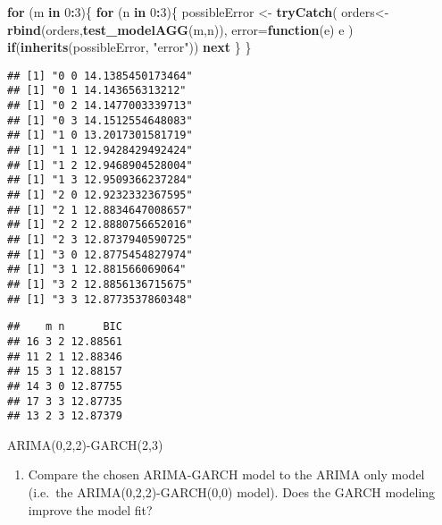 \documentclass[
]{article}
\newenvironment{Shaded}{\begin{snugshade}}{\end{snugshade}}
\newcommand{\ControlFlowTok}[1]{\textcolor[rgb]{0.13,0.29,0.53}{\textbf{#1}}}
\newcommand{\DataTypeTok}[1]{\textcolor[rgb]{0.13,0.29,0.53}{#1}}
\newcommand{\DecValTok}[1]{\textcolor[rgb]{0.00,0.00,0.81}{#1}}
\newcommand{\KeywordTok}[1]{\textcolor[rgb]{0.13,0.29,0.53}{\textbf{#1}}}
\newcommand{\NormalTok}[1]{#1}
\newcommand{\OperatorTok}[1]{\textcolor[rgb]{0.81,0.36,0.00}{\textbf{#1}}}
\newcommand{\StringTok}[1]{\textcolor[rgb]{0.31,0.60,0.02}{#1}}
\providecommand{\tightlist}{%
  \setlength{\itemsep}{0pt}\setlength{\parskip}{0pt}}
\begin{document}
\begin{Shaded}
\begin{Highlighting}[]
\ControlFlowTok{for}\NormalTok{ (m }\ControlFlowTok{in} \DecValTok{0}\OperatorTok{:}\DecValTok{3}\NormalTok{)\{}
     \ControlFlowTok{for}\NormalTok{ (n }\ControlFlowTok{in} \DecValTok{0}\OperatorTok{:}\DecValTok{3}\NormalTok{)\{}
\NormalTok{          possibleError \textless{}{-}}\StringTok{ }\KeywordTok{tryCatch}\NormalTok{(}
\NormalTok{            orders\textless{}{-}}\KeywordTok{rbind}\NormalTok{(orders,}\KeywordTok{test\_modelAGG}\NormalTok{(m,n)),}
            \DataTypeTok{error=}\ControlFlowTok{function}\NormalTok{(e) e}
\NormalTok{          )}
          \ControlFlowTok{if}\NormalTok{(}\KeywordTok{inherits}\NormalTok{(possibleError, }\StringTok{"error"}\NormalTok{)) }\ControlFlowTok{next}
\NormalTok{          \}}
\NormalTok{\}}
\end{Highlighting}
\end{Shaded}

\begin{verbatim}
## [1] "0 0 14.1385450173464"
## [1] "0 1 14.143656313212"
## [1] "0 2 14.1477003339713"
## [1] "0 3 14.1512554648083"
## [1] "1 0 13.2017301581719"
## [1] "1 1 12.9428429492424"
## [1] "1 2 12.9468904528004"
## [1] "1 3 12.9509366237284"
## [1] "2 0 12.9232332367595"
## [1] "2 1 12.8834647008657"
## [1] "2 2 12.8880756652016"
## [1] "2 3 12.8737940590725"
## [1] "3 0 12.8775454827974"
## [1] "3 1 12.881566069064"
## [1] "3 2 12.8856136715675"
## [1] "3 3 12.8773537860348"
\end{verbatim}

\begin{Shaded}
\end{Shaded}

\begin{verbatim}
##    m n      BIC
## 16 3 2 12.88561
## 11 2 1 12.88346
## 15 3 1 12.88157
## 14 3 0 12.87755
## 17 3 3 12.87735
## 13 2 3 12.87379
\end{verbatim}

ARIMA(0,2,2)-GARCH(2,3)

\begin{enumerate}
\def\labelenumi{(\alph{enumi})}
\setcounter{enumi}{1}
\tightlist
\item
  Compare the chosen ARIMA-GARCH model to the ARIMA only model (i.e.~the
  ARIMA(0,2,2)-GARCH(0,0) model). Does the GARCH modeling improve the
  model fit?
\end{enumerate}
\end{document}
